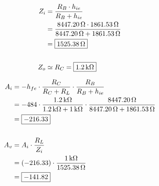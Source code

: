       
      \noindent
      \begin{minipage}[t]{0.45\linewidth}
      \begin{align*}
      Z_i &= \frac{R_B \cdot h_{ie}}{R_B + h_{ie}} \\
          &= \frac{8447.20\,\Omega \cdot 1861.53\,\Omega}{8447.20\,\Omega + 1861.53\,\Omega} \\
          &= \boxed{1525.38\,\Omega} \\[16pt]
      Z_o &\simeq R_C = \boxed{1.2\,\text{k}\Omega}
      \end{align*}
      \end{minipage}\hfill
      \begin{minipage}[t]{0.45\linewidth}
      \begin{align*}
      A_i &= -h_{fe}\cdot \frac{R_C}{R_C+R_L}\cdot \frac{R_B}{R_B+h_{ie}} \\
          &= -484 \cdot \frac{1.2\,\text{k}\Omega}{1.2\,\text{k}\Omega+1\,\text{k}\Omega}\cdot \frac{8447.20\,\Omega}{8447.20\,\Omega+1861.53\,\Omega} \\
          &= \boxed{-216.33} \\[16pt]
      A_v &= A_i \cdot \frac{R_L}{Z_i} \\
          &= (-216.33)\cdot \frac{1\,\text{k}\Omega}{1525.38\,\Omega} \\
          &= \boxed{-141.82}
      \end{align*}
      \end{minipage}    


